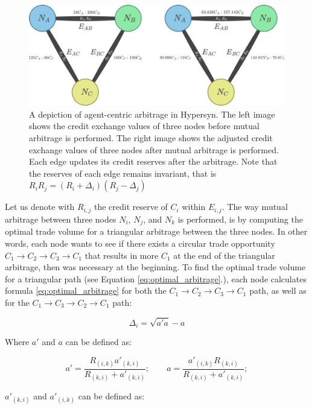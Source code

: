 \documentclass{article}
\begin{document}
\begin{figure}[h]
\centering\includegraphics[width=0.75\linewidth]{figures/mutual_arbitrage.png}
\caption{A depiction of agent-centric arbitrage in Hypersyn. The left image shows the credit exchange values of three nodes before mutual arbitrage is performed. The right image shows the adjusted credit exchange values of three nodes after mutual arbitrage is performed. Each edge updates its credit reserves after the arbitrage. Note that the reserves of each edge remains invariant, that is $R_i R_j = (R_i + \Delta_i)(R_j - \Delta_j)$
}
\label{fig:mutual_arbitrage}
\end{figure}

Let us denote with $R_{i,j}$ the credit reserve of $C_i$ within $E_{i,j}$. The way mutual arbitrage between three nodes $N_i$, $N_j$, and $N_k$ is performed, is by computing the optimal trade volume for a triangular arbitrage between the three nodes. In other words, each node wants to see if there exists a circular trade opportunity $C_1 \rightarrow C_2 \rightarrow C_3 \rightarrow C_1$ that results in more $C_1$ at the end of the triangular arbitrage, then was necessary at the beginning. To find the optimal trade volume for a triangular path (see Equation \ref{eq:optimal_arbitrage}.), each node calculates formula \ref{eq:optimal_arbitrage} for both the $C_1 \rightarrow C_2 \rightarrow C_3 \rightarrow C_1$ path, as well as for the $C_1 \rightarrow C_3 \rightarrow C_2 \rightarrow C_1$ path:

\begin{equation}
\label{eq:optimal_arbitrage}
 \Delta_{i} = \sqrt{a' a} - a
\end{equation}

Where $a'$ and $a$ can be defined as:

\begin{equation}
\label{eq:optimal_arbitrage_elaboration1}
        a' = \frac{R_{(i,k)} a'_{(k,i)}}{R_{(k,i)} + a'_{(k,i)}}; \qquad a = \frac{a'_{(i,k)} R_{(k,i)}}{R_{(k,i)} + a'_{(k,i)}};
\end{equation}

$a'_{(k,i)}$ and $a'_{(i,k)}$ can be defined as:
\end{document}
